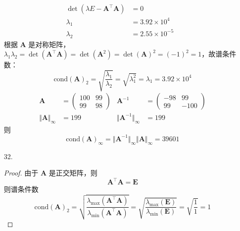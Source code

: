 \documentclass{sjtuarticle}
\begin{document}
\begin{itemize}
\begin{solution}
\begin{align*}
            \det(\lambda E-\bm{A}^\top\bm{A})&=0\\
            \lambda_1&=3.92\times 10^4 & \\
            \lambda_2&=2.55\times 10^{-5} &
        \end{align*}
        根据 $\bm{A}$ 是对称矩阵，$\lambda_1\lambda_2=\det(\bm{A}^\top\bm{A})=\det(\bm{A}^2)=\det(\bm{A})^2=(-1)^2=1$，故谱条件数：
        \begin{equation}
            \text{cond}(\bm{A})_2=\sqrt{\frac{\lambda_1}{\lambda_2}}=\sqrt{\lambda_1^2}=\lambda_1=3.92\times 10^4 
        \end{equation}
        \begin{align*}
            \bm{A}&=\begin{pmatrix}
                100 & 99 \\
                99 & 98
            \end{pmatrix}
            &\bm{A}^{-1}&=\begin{pmatrix}
                -98 & 99 \\
                99 & -100
            \end{pmatrix}\\
            \Vert\bm{A}\Vert_\infty&=199&\Vert\bm{A}^{-1}\Vert_\infty&=199
        \end{align*}
        则
        \begin{equation}
            \text{cond}(\bm{A})_\infty=\Vert\bm{A}^{-1}\Vert_\infty\Vert\bm{A}\Vert_\infty=39601
        \end{equation}
    \end{solution}
    \item[32.]\begin{proof}
        由于 $\bm{A}$ 是正交矩阵，则
        \begin{equation*}
            \bm{A}^\top\bm{A}=\bm{E}
        \end{equation*}
        则谱条件数
        \begin{equation*}
            \text{cond}(\bm{A})_2=\sqrt{\frac{\lambda_{\text{max}}(\bm{A}^\top\bm{A})}{\lambda_{\text{min}}(\bm{A}^\top\bm{A})}}=\sqrt{\frac{\lambda_{\text{max}}(\bm{E})}{\lambda_{\text{min}}(\bm{E})}}=\sqrt{\frac{1}{1}}=1
        \end{equation*}
    \end{proof}
\end{itemize}
\end{document}
